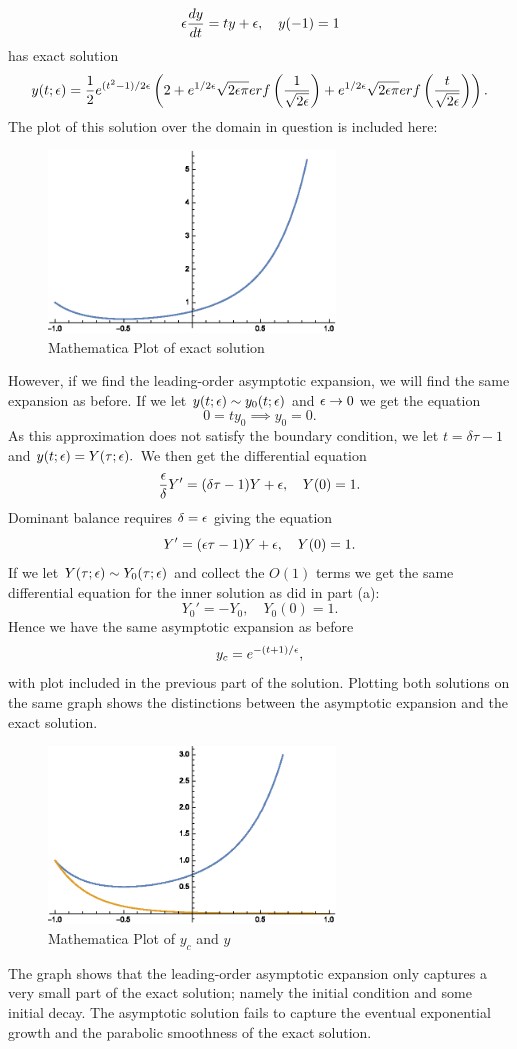 \item
$$\epsilon \frac{dy}{dt} = ty+\epsilon, \quad y(-1) = 1$$
has exact solution
$$y(t;\epsilon)=\frac{1}{2}e^{(t^2-1)/2\epsilon}\left(2+e^{1/2\epsilon}\sqrt{2\epsilon\pi}erf\left(\frac{1}{\sqrt{2\epsilon}}\right)+e^{1/2\epsilon}\sqrt{2\epsilon\pi}erf\left(\frac{t}{\sqrt{2\epsilon}}\right)\right).$$
The plot of this solution over the domain in question is included here:
\begin{figure}[h]
\centering\includegraphics[width=3in]{ass3no1prtb}
\caption{Mathematica Plot of exact solution}
\end{figure}
However, if we find the leading-order asymptotic expansion, we will find the same expansion as before. If we let $y(t;\epsilon)\sim y_0(t;\epsilon)$ and $\epsilon\to 0$ we get the equation
$$0=t y_0\implies y_0=0.$$
As this approximation does not satisfy the boundary condition, we let $t=\delta\tau-1$ and $y(t;\epsilon)=Y(\tau;\epsilon).$ We then get the differential equation
$$\frac{\epsilon}{\delta}Y'=(\delta \tau-1)Y+\epsilon,\quad Y(0)=1.$$
Dominant balance requires $\delta=\epsilon$ giving the equation
$$Y'=(\epsilon\tau-1)Y+\epsilon,\quad Y(0)=1.$$
If we let $Y(\tau;\epsilon)\sim Y_0(\tau;\epsilon)$ and collect the $O(1)$ terms we get the same differential equation for the inner solution as did in part (a):
$$Y_0'=-Y_0,\quad Y_0(0)=1.$$
Hence we have the same asymptotic expansion as before
$$y_c=e^{-(t+1)/\epsilon},$$
with plot included in the previous part of the solution. Plotting both solutions on the same graph shows the distinctions between the asymptotic expansion and the exact solution.
\begin{figure}
\centering
\includegraphics[width=3in]{ass3no1prtb2}
\caption{Mathematica Plot of $y_c$ and $y$}
\end{figure}
The graph shows that the leading-order asymptotic expansion only captures a very small part of the exact solution; namely the initial condition and some initial decay. The asymptotic solution fails to capture the eventual exponential growth and the parabolic smoothness of the exact solution.
\eenum



